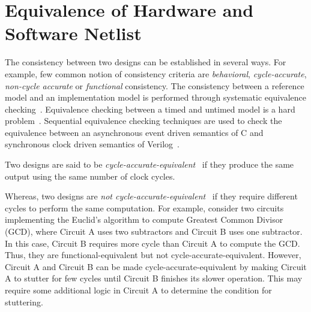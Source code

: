 \section{Equivalence of Hardware and Software Netlist}
%
The consistency between two designs can be established in several ways. 
For example, few common notion of consistency criteria are \emph{behavioral}, 
\emph{cycle-accurate}, \emph{non-cycle accurate} or \emph{functional}
consistency.  The consistency between a reference model and an implementation
model is performed through systematic equivalence checking~\cite{}.  Equivalence
checking between a timed and untimed model is a hard
problem~\cite{}.  Sequential equivalence checking techniques are used to check 
the equivalence between an asynchronous event driven semantics of C and synchronous 
clock driven semantics of Verilog~\cite{}.


Two designs are said to be \emph{cycle-accurate-equivalent}~\cite{cycle}  if they produce the same output using the same number of clock cycles.   

Whereas, two designs are \emph{not cycle-accurate-equivalent}~\cite{cycle} if they require 
different cycles to perform the same computation. For example, consider two circuits
implementing the Euclid's algorithm to compute Greatest Common Divisor (GCD),
where Circuit A uses two subtractors and Circuit B uses one subtractor.  In this
case, Circuit B requires more cycle than Circuit A to compute the GCD. Thus,
they are functional-equivalent but not cycle-accurate-equivalent. However,
Circuit A and Circuit B can be made cycle-accurate-equivalent by making Circuit
A to stutter for few cycles until Circuit B finishes its slower operation.  This
may require some additional logic in Circuit A to determine the condition for 
stuttering.  


